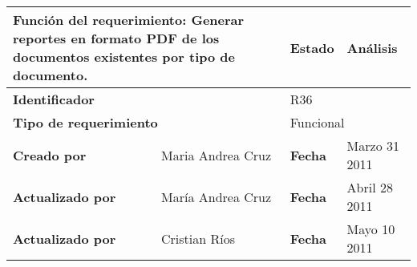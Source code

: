 %
\begin{center}
\begin{longtable}{|p{}|p{}|p{}|p{}|}
\hline
\multicolumn{2}{|p{0.45\textwidth}|}{{\bf {Función del requerimiento:}}
Generar reportes en formato PDF de los documentos existentes por tipo de documento. } & {\bf{ Estado}} & Análisis \\
\hline
\multicolumn{2}{|p{0.45\textwidth}}{\bf Identificador} &
\multicolumn{2}{|p{0.45\textwidth}|}{R36} \\
\hline
\multicolumn{2}{|p{0.45\textwidth}}{\bf {Tipo de requerimiento}} &
\multicolumn{2}{|p{0.45\textwidth}|}{Funcional}\\
\hline
\bf {Creado por} & Maria Andrea Cruz & \bf {Fecha } & Marzo 31 2011 \\
\hline
\bf {Actualizado por} & María Andrea Cruz & \bf {Fecha }& Abril 28 2011\\
\hline
\bf {Actualizado por} & Cristian Ríos & \bf {Fecha }& Mayo 10 2011\\



\end{longtable}
\end{center}
